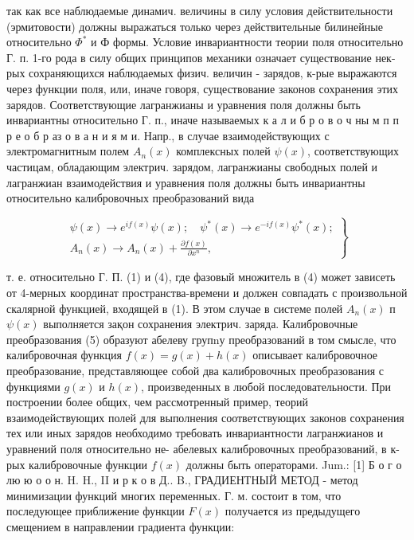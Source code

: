 \documentclass[10pt]{article}
\begin{document}
так как все наблюдаемые динамич. величины в силу условия действительности (эрмитовости) должны выражаться только через действительные билинейные относительно $\Phi^{*}$ и Ф формы. Условие инвариантности теории поля относительно Г. п. 1-го рода в силу общих принципов механики означает существование нек-рых сохраняющихся наблюдаемых физич. величин - зарядов, к-рые выражаются через функции поля, или, иначе говоря, существование законов сохранения этих зарядов. Соответствующие лагранжианы и уравнения поля должны быть инвариантны относительно Г. п., иначе называемых к а л и б р о в о ч ны м п п р е о б р аз о в а н и я м и. Напр., в случае взаимодействующих с электромагнитным полем $A_{n}(x)$ комплексных полей $\psi(x)$, соответствующих частицам, обладающим электрич. зарядом, лагранжианы свободных полей и лагранжиан взаимодействия и уравнения поля должны быть инвариантны относительно калибровочных преобразований вида



\[

\left.\begin{array}{c}

\psi(x) \longrightarrow e^{i f(x)} \psi(x) ; \quad \psi^{*}(x) \longrightarrow e^{-i f(x)} \psi^{*}(x) ; \\

A_{n}(x) \longrightarrow A_{n}(x)+\frac{\partial f(x)}{\partial x^{n}},

\end{array}\right\}

\]



т. е. относительно Г. П. (1) и (4), где фазовый множитель в (4) может зависеть от 4-мерных координат пространства-времени и должен совпадать с произвольной скалярной функцией, входящей в (1). В этом случае в системе полей $A_{n}(x)$ п $\psi(x)$ выполняется зақон сохранения электрич. заряда. Калибровочные преобразования (5) образуют абелеву групnу преобразований в том смысле, что калибровочная функция $f(x)=g(x)+h(x)$ описывает калибровочное преобразование, представляющее собой два калибровочных преобразования с функциями $g(x)$ и $h(x)$, произведенных в любой последовательности. При построении более общих, чем рассмотренный пример, теорий взаимодействующих полей для выполнения соответствующих законов сохранения тех или иных зарядов необходимо требовать инвариантности лагранжианов и уравнений поля относительно не- абелевых калибровочных преобразований, в к-рых калибровочные функции $f(x)$ должны быть операторами. Jum.: [1] Б о г о лю ю о о н. H. H., II и р к о в Д.. B., ГРАДИЕНТНЫЙ МЕТОД - метод минимизации функций многих переменных. Г. м. состоит в том, что последующее приближение функции $F(x)$ получается из предыдущего смещением в направлении градиента функции:
\end{document}
